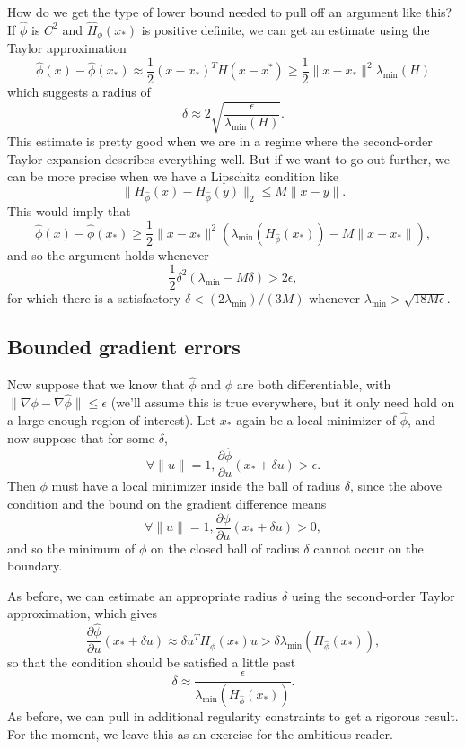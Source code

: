 \documentclass[12pt, leqno]{article} %
\begin{document}
How do we get the type of lower bound needed to pull off an argument
like this? If \(\hat{\phi}\) is \(C^2\) and \(\hat{H}_{\phi}(x_*)\) is
positive definite, we can get an estimate using the Taylor approximation
\[\hat{\phi}(x)-\hat{\phi}(x_*) 
  \approx \frac{1}{2} (x-x_*)^T H (x-x^*)
  \geq \frac{1}{2} \|x-x_*\|^2 \lambda_{\min}(H)\] which suggests a
radius of
\[\delta \approx 2 \sqrt{\frac{\epsilon}{\lambda_{\min}(H)}}.\] This
estimate is pretty good when we are in a regime where the second-order
Taylor expansion describes everything well. But if we want to go out
further, we can be more precise when we have a Lipschitz condition like
\[\|H_{\hat{\phi}}(x)-H_{\hat{\phi}}(y)\|_2 \leq M \|x-y\|.\] This would
imply that \[\hat{\phi}(x)-\hat{\phi}(x_*) \geq
  \frac{1}{2} \|x-x_*\|^2 (\lambda_{\min}(H_{\hat{\phi}}(x_*))-M\|x-x_*\|),\]
and so the argument holds whenever
\[\frac{1}{2} \delta^2 (\lambda_{\min}-M\delta) > 2 \epsilon,\] for
which there is a satisfactory \(\delta < (2\lambda_{\min})/(3M)\)
whenever \(\lambda_{\min} > \sqrt{18 M \epsilon}\).

\subsection{Bounded gradient errors}

Now suppose that we know that \(\hat{\phi}\) and \(\phi\) are both
differentiable, with \(\|\nabla \phi-\nabla \hat{\phi}\| \leq \epsilon\)
(we'll assume this is true everywhere, but it only need hold on a large
enough region of interest). Let \(x_*\) again be a local minimizer of
\(\hat{\phi}\), and now suppose that for some \(\delta\),
\[\forall \|u\|=1, \frac{\partial \hat{\phi}}{\partial u}(x_*+\delta u) > \epsilon.\]
Then \(\phi\) must have a local minimizer inside the ball of radius
\(\delta\), since the above condition and the bound on the gradient
difference means
\[\forall \|u\|=1, \frac{\partial \phi}{\partial u}(x_* + \delta u) > 0,\]
and so the minimum of \(\phi\) on the closed ball of radius \(\delta\)
cannot occur on the boundary.

As before, we can estimate an appropriate radius \(\delta\) using the
second-order Taylor approximation, which gives
\[\frac{\partial \hat{\phi}}{\partial u}(x_* + \delta u) 
  \approx \delta u^T H_{\hat{\phi}}(x_*) u 
  > \delta \lambda_{\min}(H_{\hat{\phi}}(x_*)),\] so that the condition
should be satisfied a little past
\[\delta \approx \frac{\epsilon}{\lambda_{\min}(H_{\hat{\phi}}(x_*))}.\]
As before, we can pull in additional regularity constraints to get a
rigorous result. For the moment, we leave this as an exercise for the
ambitious reader.
\end{document}
